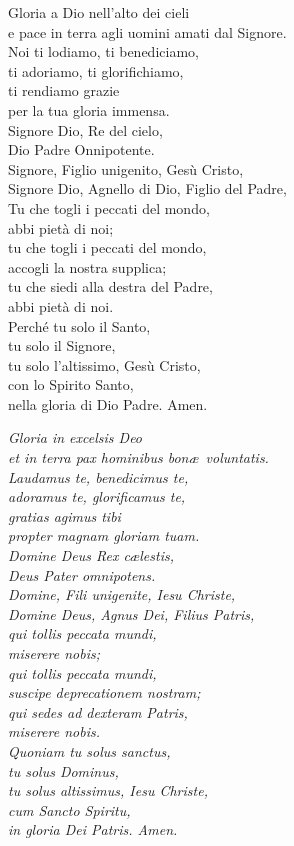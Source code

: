 
\setcounter{numstrofa}{0}

Gloria a Dio nell'alto dei cieli\\
e pace in terra agli uomini amati dal Signore.\\
Noi ti lodiamo, ti benediciamo,\\
ti adoriamo, ti glorifichiamo,\\
ti rendiamo grazie\\
per la tua gloria immensa.\\
Signore Dio, Re del cielo,\\
Dio Padre Onnipotente.\\
Signore, Figlio unigenito, Gesù Cristo,\\
Signore Dio, Agnello di Dio, Figlio del Padre,\\
Tu che togli i peccati del mondo,\\
abbi pietà di noi;\\
tu che togli i peccati del mondo,\\
accogli la nostra supplica;\\
tu che siedi alla destra del Padre,\\
abbi pietà di noi.\\
Perché tu solo il Santo,\\
tu solo il Signore,\\
tu solo l'altissimo, Gesù Cristo,\\
con lo Spirito Santo,\\
nella gloria di Dio Padre. Amen.

\bigskip

\emph{Gloria in excelsis Deo\\
et in terra pax hominibus bon\ae\ voluntatis.\\
Laudamus te, benedicimus te,\\
adoramus te, glorificamus te,\\
gratias agimus tibi\\
propter magnam gloriam tuam.\\
Domine Deus Rex c\ae lestis,\\
Deus Pater omnipotens.\\
Domine, Fili unigenite, Iesu Christe,\\
Domine Deus, Agnus Dei, Filius Patris,\\
qui tollis peccata mundi,\\
miserere nobis;\\
qui tollis peccata mundi,\\
suscipe deprecationem nostram;\\
qui sedes ad dexteram Patris,\\
miserere nobis.\\
Quoniam tu solus sanctus,\\ 
tu solus Dominus,\\
tu solus altissimus, Iesu Christe,\\
cum Sancto Spiritu,\\
in gloria Dei Patris. Amen.}

